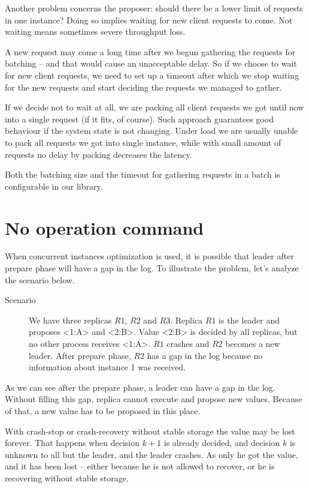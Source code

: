 Another problem concerns the proposer: should there be a lower limit of requests in one instance? Doing so implies waiting for new client requests to come. Not waiting means sometimes severe throughput loss.

A new request may come a long time after we begun gathering the requests for batching -- and that would cause an unacceptable delay. So if we choose to wait for new client requests, we need to set up a timeout after which we stop waiting for the new requests and start deciding the requests we managed to gather.

If we decide not to wait at all, we are packing all client requests we got until now into a single request (if it fits, of course). Such approach guarantees good behaviour if the system state is not changing. Under load  we are usually unable to pack all requests we got into single instance, while with small amount of requests no delay by packing decreases the latency.

Both the batching size and the timeout for gathering requests in a batch is configurable in our library.


\section{No operation command}

When concurrent instances optimization is used, it is possible that leader after prepare phase will have a gap in the log. To illustrate the problem, let's analyze the scenario below.

\begin{description}
  \item [Scenario] We have three replicas $R1$, $R2$ and $R3$. Replica $R1$ is the leader and proposes <1:A> and <2:B>. Value <2:B> is decided by all replicas, but no other process receives <1:A>. $R1$ crashes and $R2$ becomes a new leader. After prepare phase, $R2$ has a gap in the log because no information about instance 1 was received.
\end{description} 

As we can see after the prepare phase, a leader can have a gap in the log. Without filling this gap, replica cannot execute and propose new values. Because of that, a new value has to be proposed in this place.

With crash-stop or crash-recovery without stable storage the value may be lost forever. That happens when decision $k+1$ is already decided, and decision $k$ is unknown to all but the leader, and the leader crashes. As only he got the value, and it has been lost -- either because he is not allowed to recover, or he is recovering without stable storage.

